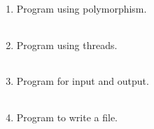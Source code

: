 \documentclass{exam}
\begin{document}
\begin{enumerate}
   \item  Program using  polymorphism.

   \begin{myTableStyle}
   \begin{center} \begin{tabular}{ |m{14cm}| } \hline
              \\ \hline
    \end{tabular} \end{center}
\end{myTableStyle}
  \pagebreak

   \item  Program using  threads.

   \begin{myTableStyle}
   \begin{center} \begin{tabular}{ |m{14cm}| } \hline
              \\ \hline
    \end{tabular} \end{center}
\end{myTableStyle}
  \pagebreak

   \item  Program for input and output.

   \begin{myTableStyle}
   \begin{center} \begin{tabular}{ |m{14cm}| } \hline
              \\ \hline
    \end{tabular} \end{center}
\end{myTableStyle}
  \pagebreak

   \item  Program to write a file.

   \begin{myTableStyle}
   \begin{center} \begin{tabular}{ |m{14cm}| } \hline
              \\ \hline
    \end{tabular} \end{center}
\end{myTableStyle}
  \pagebreak


\end{enumerate}
\end{document}
